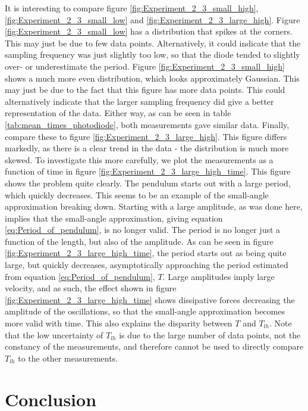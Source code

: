 \documentclass[a4paper, 10pt]{article}
\begin{document}
It is interesting to compare figure \ref{fig:Experiment_2_3_small_high}, \ref{fig:Experiment_2_3_small_low} and \ref{fig:Experiment_2_3_large_high}. Figure \ref{fig:Experiment_2_3_small_low} has a distribution that spikes at the corners. This may just be due to few data points. Alternatively, it could indicate that the sampling frequency was just slightly too low, so that the diode tended to slightly over- or underestimate the period. Figure \ref{fig:Experiment_2_3_small_high} shows a much more even distribution, which looks approximately Gaussian. This may just be due to the fact that  this figure has more data points. This could alternatively indicate that the larger sampling frequency did give a better representation of the data. Either way, as can be seen in table \ref{tab:mean_times_photodiode}, both measurements gave similar data. Finally, compare these to figure \ref{fig:Experiment_2_3_large_high}. This figure differs markedly, as there is a clear trend in the data - the distribution is much more skewed. To investigate this more carefully, we plot the measurements as a function of time in figure \ref{fig:Experiment_2_3_large_high_time}. This figure shows the problem quite clearly. The pendulum starts out with a large period, which quickly decreases. This seems to be an example of the small-angle approximation breaking down. Starting with a large amplitude, as was done here, implies that the small-angle approximation, giving equation \ref{eq:Period_of_pendulum}, is no longer valid. The period is no longer just a function of the length, but also of the amplitude. As can be seen in figure \ref{fig:Experiment_2_3_large_high_time}, the  period starts out as being quite large, but quickly decreases, asymptotically approaching the period estimated from equation \ref{eq:Period_of_pendulum}, $T$. Large amplitudes imply large velocity, and as such, the effect shown in figure \ref{fig:Experiment_2_3_large_high_time} shows dissipative forces decreasing the amplitude of the oscillations, so that the small-angle approximation becomes more valid with time. This also explains the disparity between $T$ and $T_{lh}$. Note that the low uncertainty of $T_{lh}$ is due to the large number of data points, not the constancy of the measurements, and therefore cannot be used to directly compare $T_{lh}$ to the other measurements. 
\section{Conclusion}
\end{document}
